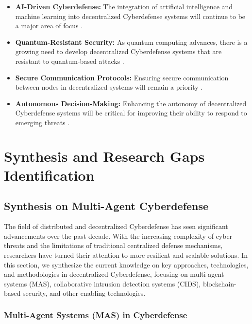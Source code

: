 \begin{itemize}
    \item \textbf{AI-Driven Cyberdefense:} The integration of artificial intelligence and machine learning into decentralized Cyberdefense systems will continue to be a major area of focus \cite{Kaur2023}.

    \item \textbf{Quantum-Resistant Security:} As quantum computing advances, there is a growing need to develop decentralized Cyberdefense systems that are resistant to quantum-based attacks \cite{Bernstein2017}.

    \item \textbf{Secure Communication Protocols:} Ensuring secure communication between nodes in decentralized systems will remain a priority \cite{Granjal2015}.

    \item \textbf{Autonomous Decision-Making:} Enhancing the autonomy of decentralized Cyberdefense systems will be critical for improving their ability to respond to emerging threats \cite{Nguyen2019}.
\end{itemize}



\section{Synthesis and Research Gaps Identification}

\subsection{Synthesis on Multi-Agent Cyberdefense}

The field of distributed and decentralized Cyberdefense has seen significant advancements over the past decade. With the increasing complexity of cyber threats and the limitations of traditional centralized defense mechanisms, researchers have turned their attention to more resilient and scalable solutions. In this section, we synthesize the current knowledge on key approaches, technologies, and methodologies in decentralized Cyberdefense, focusing on multi-agent systems (MAS), collaborative intrusion detection systems (CIDS), blockchain-based security, and other enabling technologies.

\subsubsection{Multi-Agent Systems (MAS) in Cyberdefense}

